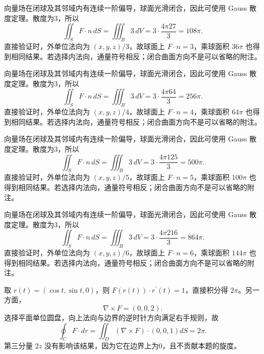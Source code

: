 \documentclass[12pt,fontset=fandol]{ctexart}
\begin{document}
\begin{solve}\label{ans:c43q15}
向量场在闭球及其邻域内有连续一阶偏导，球面光滑闭合，因此可使用 Gauss 散度定理。散度为3，所以
\[
\iint_SF\cdot n\,dS=\iiint_B3\,dV=3\cdot\frac{4\pi27}3=108\pi.
\]
直接验证时，外单位法向为 $(x,y,z)/3$，故球面上 $F\cdot n=3$，乘球面积 $36\pi$ 也得到相同结果。若选择内法向，通量符号相反；闭合曲面方向不是可以省略的附注。
\end{solve}

\begin{solve}\label{ans:c43q16}
向量场在闭球及其邻域内有连续一阶偏导，球面光滑闭合，因此可使用 Gauss 散度定理。散度为3，所以
\[
\iint_SF\cdot n\,dS=\iiint_B3\,dV=3\cdot\frac{4\pi64}3=256\pi.
\]
直接验证时，外单位法向为 $(x,y,z)/4$，故球面上 $F\cdot n=4$，乘球面积 $64\pi$ 也得到相同结果。若选择内法向，通量符号相反；闭合曲面方向不是可以省略的附注。
\end{solve}

\begin{solve}\label{ans:c43q17}
向量场在闭球及其邻域内有连续一阶偏导，球面光滑闭合，因此可使用 Gauss 散度定理。散度为3，所以
\[
\iint_SF\cdot n\,dS=\iiint_B3\,dV=3\cdot\frac{4\pi125}3=500\pi.
\]
直接验证时，外单位法向为 $(x,y,z)/5$，故球面上 $F\cdot n=5$，乘球面积 $100\pi$ 也得到相同结果。若选择内法向，通量符号相反；闭合曲面方向不是可以省略的附注。
\end{solve}

\begin{solve}\label{ans:c43q18}
向量场在闭球及其邻域内有连续一阶偏导，球面光滑闭合，因此可使用 Gauss 散度定理。散度为3，所以
\[
\iint_SF\cdot n\,dS=\iiint_B3\,dV=3\cdot\frac{4\pi216}3=864\pi.
\]
直接验证时，外单位法向为 $(x,y,z)/6$，故球面上 $F\cdot n=6$，乘球面积 $144\pi$ 也得到相同结果。若选择内法向，通量符号相反；闭合曲面方向不是可以省略的附注。
\end{solve}

\begin{solve}\label{ans:c43q19}
取 $r(t)=(\cos t,\sin t,0)$，则 $F(r(t))\cdot r^{\prime}(t)=1$，直接积分得 $2\pi$。另一方面，
\[
\nabla\times F=(0,0,2).
\]
选择平面单位圆盘，向上法向与边界的逆时针方向满足右手规则，故
\[
\oint_C F\cdot dr=\iint_D(\nabla\times F)\cdot(0,0,1)dS=2\pi.
\]
第三分量 $2z$ 没有影响该结果，因为它在边界上为0，且不贡献本题的旋度。
\end{solve}
\end{document}
